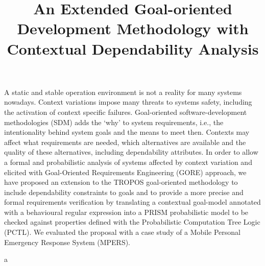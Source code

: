 \documentclass[mestrado]{unb-cic}
\title{An Extended Goal-oriented Development Methodology with Contextual Dependability Analysis}%
\begin{document}
  \maketitle

  \begin{dedicatoria}

  \end{dedicatoria}

  \begin{agradecimentos}

  \end{agradecimentos}


  \begin{resumo}
  A static and stable operation environment is not a reality for many systems nowadays. Context variations impose many threats to systems safety, including the activation of context specific failures. Goal-oriented software-development methodologies (SDM) adds the `why' to system requirements, i.e., the intentionality behind system goals and the means to meet then. Contexts may affect what requirements are needed, which alternatives are available and the quality of these alternatives, including dependability attributes. In order to allow a formal and probabilistic analysis of systems affected by context variation and elicited with Goal-Oriented Requirements Engineering (GORE) approach, we have proposed an extension to the TROPOS goal-oriented methodology to include dependability constraints to goals and to provide a more precise and formal requirements verification by translating a contextual goal-model annotated with a behavioural regular expression into a PRISM probabilistic model to be checked against properties defined with the Probabilistic Computation Tree Logic (PCTL). We evaluated the proposal with a case study of a Mobile Personal Emergency Response System (MPERS).
  \end{resumo}

  a
  \begin{abstract}
  	
  \end{abstract}
  \tableofcontents
  \listoffigures
  \listoftables

\renewcommand{\appendixname}{Anexo}


  \textual
  
  
  
  
    
      
  

  \postextual
  
  

\appendix
\end{document}
